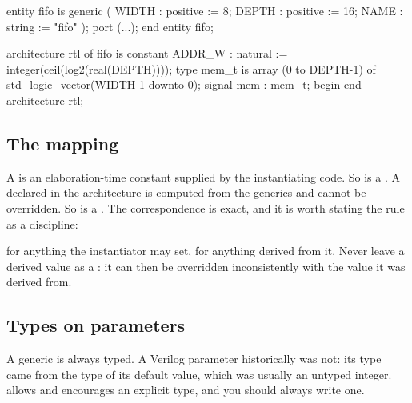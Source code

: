 \begin{rosetta}
\begin{rleft}
entity fifo is
  generic (
    WIDTH : positive := 8;
    DEPTH : positive := 16;
    NAME  : string   := "fifo"
  );
  port (...);
end entity fifo;

architecture rtl of fifo is
  constant ADDR_W : natural :=
    integer(ceil(log2(real(DEPTH))));
  type mem_t is array (0 to DEPTH-1) of
    std_logic_vector(WIDTH-1 downto 0);
  signal mem : mem_t;
begin
end architecture rtl;
\end{rleft}
\end{rosetta}


\subsection{The mapping}

A \VHDL{}  is an elaboration-time constant supplied by the
instantiating code. So is a \SV{} . A \VHDL{} 
declared in the architecture is computed from the generics and cannot be
overridden. So is a \SV{} . The correspondence is exact, and it
is worth stating the rule as a discipline:

\begin{ruleofthumb}
 for anything the instantiator may set,  for
anything derived from it. Never leave a derived value as a : it
can then be overridden inconsistently with the value it was derived from.
\end{ruleofthumb}

\subsection{Types on parameters}

A \VHDL{} generic is always typed. A Verilog parameter historically was not:
its type came from the type of its default value, which was usually an
untyped integer. \SV{} allows and encourages an explicit type, and you should
always write one.

